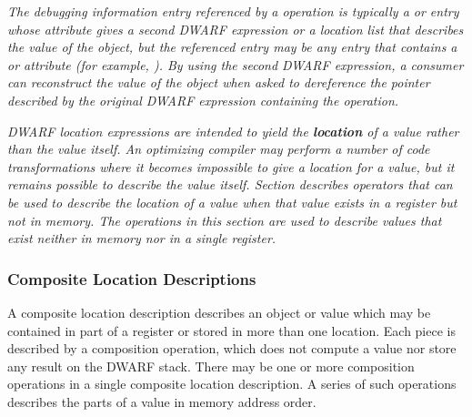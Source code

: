 \begin{enumerate}[1. ]
\textit{The debugging information entry referenced by a 
\DWOPimplicitpointerNAME{} operation is typically a
\DWTAGvariable{} or \DWTAGformalparameter{} entry whose
\DWATlocation{} attribute gives a second DWARF expression or a
location list that describes the value of the object, but the
referenced entry may be any entry that contains a \DWATlocation{}
or \DWATconstvalue{} attribute (for example, \DWTAGdwarfprocedure).
By using the second DWARF expression, a consumer can
reconstruct the value of the object when asked to dereference
the pointer described by the original DWARF expression
containing the \DWOPimplicitpointer{} operation.}

\end{enumerate}

\textit{DWARF location expressions are intended to yield the \textbf{location}
of a value rather than the value itself. An optimizing compiler
may perform a number of code transformations where it becomes
impossible to give a location for a value, but it remains possible
to describe the value itself. 
Section 
describes operators that can be used to
describe the location of a value when that value exists in a
register but not in memory. The operations in this section are
used to describe values that exist neither in memory nor in a
single register.}

\bbpareb

\subsubsection{Composite Location Descriptions}
A composite location description describes an object or
value which may be contained in part of a register or stored
in more than one location. Each piece is described by a
composition operation, which does not compute a value nor
store any result on the DWARF stack. There may be one or
more composition operations in a single composite location
description. A series of such operations describes the parts
of a value in memory address order.

